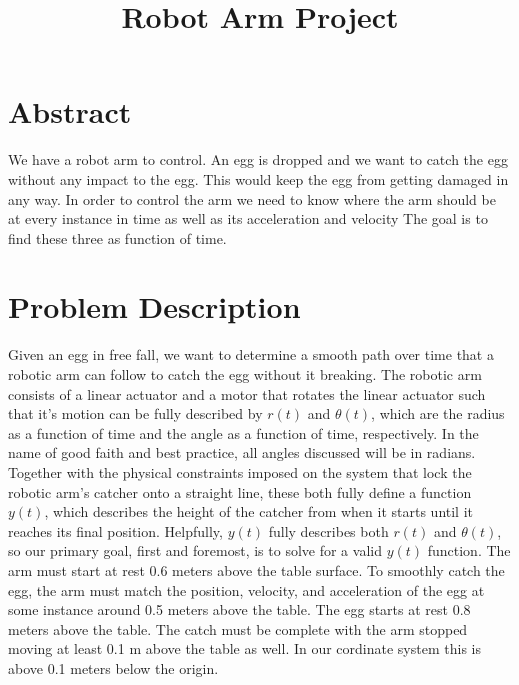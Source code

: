 \documentclass[nofoot,pdf-a,balance,colorlinks,upint,subscriptcorrection,varvw,mathalfa=cal=boondoxo]{asmeconf}
\begin{document}

    \title{Robot Arm Project}

    \maketitle

   \section*{Abstract}
	We have a robot arm to control. An egg is dropped and we want to catch the egg without any impact to the egg. This would keep the egg from getting damaged in any way. In order to control the arm we need to know where the arm should be at every instance in time as well as its acceleration and velocity The goal is to find these three as function of time.

    \section*{Problem Description}
	
    Given an egg in free fall, we want to determine a smooth path over time that a robotic arm can follow to catch the egg without it breaking. The robotic arm consists of a linear actuator and a motor that rotates the linear actuator such that it's motion can be fully described by $r\left(t\right)$ and $\theta\left(t\right)$, which are the radius as a function of time and the angle as a function of time, respectively. In the name of good faith and best practice, all angles discussed will be in radians. Together with the physical constraints imposed on the system that lock the robotic arm's catcher onto a straight line, these both fully define a function $y\left(t\right)$, which describes the height of the catcher from when it starts until it reaches its final position. Helpfully, $y\left(t\right)$ fully describes both $r\left(t\right)$ and $\theta\left(t\right)$, so our primary goal, first and foremost, is to solve for a valid $y\left(t\right)$ function. The arm must start at rest 0.6 meters above the table surface. To smoothly catch the egg, the arm must match the position, velocity, and acceleration of the egg at some instance around 0.5 meters above the table. The egg starts at rest 0.8 meters above the table. The catch must be complete with the arm stopped moving at least 0.1 m above the table as well. In our cordinate system this is above 0.1 meters below the origin. \newline
\end{document}
